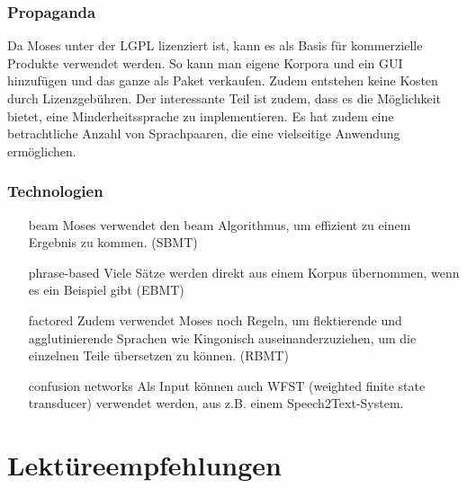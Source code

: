 \documentclass[11pt,twoside]{mparticle}
\begin{document}
\subsubsection{Propaganda}
Da Moses unter der LGPL lizenziert ist, kann es als Basis für
kommerzielle Produkte verwendet werden. So kann man eigene Korpora und
ein GUI hinzufügen und das ganze als Paket verkaufen. Zudem entstehen
keine Kosten durch Lizenzgebühren. Der interessante Teil ist zudem,
dass es die Möglichkeit bietet, eine Minderheitssprache zu
implementieren. Es hat zudem eine betrachtliche Anzahl von
Sprachpaaren, die eine vielseitige Anwendung ermöglichen.

\subsubsection{Technologien}
\begin{itemize}
  \item[beam] Moses verwendet den beam Algorithmus, um effizient zu
    einem Ergebnis zu kommen. (SBMT)
  \item[phrase-based] Viele Sätze werden direkt aus einem Korpus
    übernommen, wenn es ein Beispiel gibt (EBMT)
  \item[factored] Zudem verwendet Moses noch Regeln, um flektierende
    und agglutinierende Sprachen wie Kingonisch auseinanderzuziehen,
    um die einzelnen Teile übersetzen zu können. (RBMT)
  \item[confusion networks] Als Input können auch WFST (weighted
    finite state transducer) verwendet werden, aus z.B. einem
    Speech2Text-System.
\end{itemize}

\section{Lektüreempfehlungen}
\label{lektuere}



\end{document}
